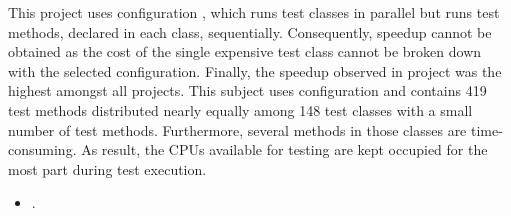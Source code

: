 This project uses configuration \ParClassSeqMeth{}, which runs test
classes in parallel but runs test methods, declared in each class,
sequentially.
Consequently, speedup cannot be obtained as the cost of the single
expensive test class cannot be broken down with the selected
configuration.
Finally, the speedup observed in project  was
the highest amongst all projects. This subject uses configuration
\ParClassParMeth{} and contains 419 test methods distributed nearly
equally among 148 test classes with a small number of test methods.
Furthermore, several methods in those classes are time-consuming.
As result, the CPUs available for testing are kept occupied for the
most part during test execution.

\begin{center}
\vspace{1ex}
\vspace{1ex}
\end{center}

\begin{itemize}
    \item \numRQSpeedupTwo{}. \textbf{\RQSpeedupTwo}
\end{itemize}

\newcommand{\subjectScalability}{MapDB}

